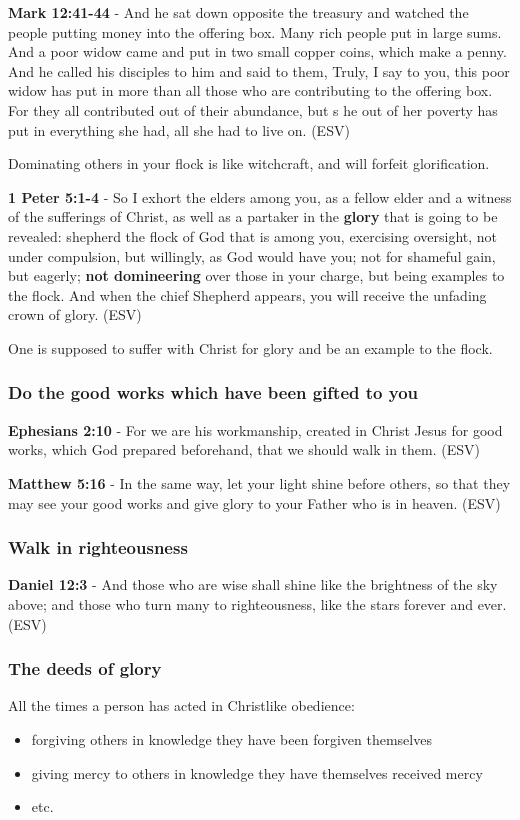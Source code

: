 \documentclass[11pt]{article}
\begin{document}
\textbf{Mark 12:41-44} - And he sat down opposite the treasury and watched the people putting money into the offering box. Many rich people put in large sums. And a poor widow came and put in two small copper coins, which make a penny. And he called his disciples to him and said to them, Truly, I say to you, this poor widow has put in more than all those who are contributing to the offering box. For they all contributed out of their abundance, but s he out of her poverty has put in everything she had, all she had to live on. (ESV)

Dominating others in your flock is like witchcraft, and will forfeit glorification.

\textbf{1 Peter 5:1-4} - So I exhort the elders among you, as a fellow elder and a witness of the sufferings of Christ, as well as a partaker in the \textbf{glory} that is going to be revealed: shepherd the flock of God that is among you, exercising oversight, not under compulsion, but willingly, as God would have you; not for shameful gain, but eagerly; \textbf{not domineering} over those in your charge, but being examples to the flock. And when the chief Shepherd appears, you will receive the unfading crown of glory. (ESV)

One is supposed to suffer with Christ for glory and be an example to the flock.

\subsubsection{Do the good works which have been gifted to you}
\label{sec:orgbd0d466}
\textbf{Ephesians 2:10} - For we are his workmanship, created in Christ Jesus for good works, which God prepared beforehand, that we should walk in them. (ESV)

\textbf{Matthew 5:16} - In the same way, let your light shine before others, so that they may see your good works and give glory to your Father who is in heaven. (ESV)

\subsubsection{Walk in righteousness}
\label{sec:org48d1975}

\textbf{Daniel 12:3} - And those who are wise shall shine like the brightness of the sky above; and those who turn many to righteousness, like the stars forever and ever. (ESV)

\subsubsection{The deeds of glory}
\label{sec:org1cc59e3}
All the times a person has acted in Christlike obedience:
\begin{itemize}
\item forgiving others in knowledge they have been forgiven themselves
\item giving mercy to others in knowledge they have themselves received mercy
\item etc.
\end{itemize}
\end{document}
